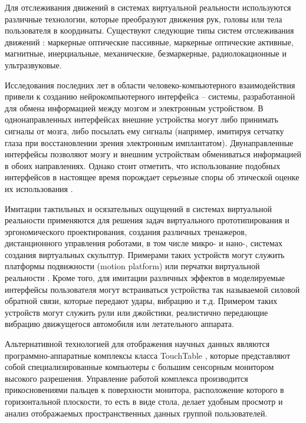 Для отслеживания движений в системах виртуальной реальности используются различные технологии, которые преобразуют движения рук, головы или тела пользователя в координаты. Существуют следующие типы систем отслеживания движений \citep{dk55}: маркерные оптические пассивные, маркерные оптические активные, магнитные, инерциальные, механические, безмаркерные, радиолокационные и ультразвуковые.

Исследования последних лет в области человеко-компьютерного взаимодействия привели к созданию нейрокомпьютерного интерфейса \citep{dk56} \citep{dk57} \citep{dk58} – системы, разработанной для обмена информацией между мозгом и электронным устройством. В однонаправленных интерфейсах внешние устройства могут либо принимать сигналы от мозга, либо посылать ему сигналы (например, имитируя сетчатку глаза при восстановлении зрения электронным имплантатом). Двунаправленные интерфейсы позволяют мозгу и внешним устройствам обмениваться информацией в обоих направлениях. Однако стоит отметить, что использование подобных интерфейсов в настоящее время порождает серьезные споры об этической оценке их использования \citep{dk59}\citep{dk60}.

Имитации тактильных и осязательных ощущений в системах виртуальной реальности применяются для решения задач виртуального прототипирования и эргономического проектирования, создания различных тренажеров, дистанционного управления роботами, в том числе микро- и нано-, системах создания виртуальных скульптур. Примерами таких устройств могут служить платформы подвижности (motion platform) \citep{dk61} или перчатки виртуальной реальности \citep{dk62}. Кроме того, для имитации различных эффектов в моделируемые интерфейсы пользователя могут встраиваться устройства так называемой силовой обратной связи, которые передают удары, вибрацию и т.д. Примером таких устройств могут служить рули или джойстики, реалистично передающие вибрацию движущегося автомобиля или летательного аппарата.

Альтернативной технологией для отображения научных данных являются программно-аппаратные комплексы класса TouchTable \citep{dk63}\citep{dk64}, которые представляют собой специализированные компьютеры с большим сенсорным монитором высокого разрешения. Управление работой комплекса производится прикосновениями пальцев к поверхности монитора, расположение которого в горизонтальной плоскости, то есть в виде стола, делает удобным просмотр и анализ отображаемых пространственных данных группой пользователей.

